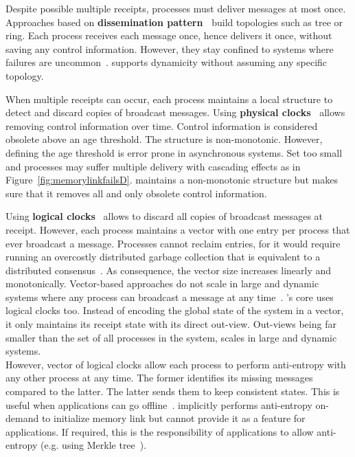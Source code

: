 Despite possible multiple receipts, processes must deliver messages at most
once. Approaches based on \textbf{dissemination
  pattern~\cite{bravo2017saturn,raynal2013distributed}} build topologies such as
tree or ring. Each process receives each message once, hence delivers it once,
without saving any control information. However, they stay confined to systems
where failures are uncommon~\cite{krasikova2016hashtable}. \RPCBROADCAST
supports dynamicity without assuming any specific topology. 

When multiple receipts can occur, each process maintains a local structure to
detect and discard copies of broadcast messages. Using \textbf{physical
  clocks~\cite{cachin2011introduction,demers1987epidemic}} allows removing
control information over time. Control information is considered obsolete above
an age threshold. The structure is non-monotonic. However, defining the age
threshold is error prone in asynchronous systems. Set too small and processes
may suffer multiple delivery with cascading effects as in
Figure~\ref{fig:memorylinkfailsD}.  \RPCBROADCAST maintains a non-monotonic
structure but makes sure that it removes all and only obsolete control
information.

Using \textbf{logical clocks}~\cite{malkhi2007concise,mukund2014optimized}
allows to discard all copies of broadcast messages at receipt. However, each
process maintains a vector with one entry per process that ever broadcast a
message.  Processes cannot reclaim entries, for it would require running an
overcostly distributed garbage collection that is equivalent to a distributed
consensus~\cite{abdullahi1998garbage}. As consequence, the vector size increases
linearly and monotonically. Vector-based approaches do not scale in large and
dynamic systems where any process can broadcast a message at any
time~\cite{nedelec2016crate}. \RPCBROADCAST's core uses logical clocks
too. Instead of encoding the global state of the system in a vector, it only
maintains its receipt state with its direct out-view. Out-views being far
smaller than the set of all processes in the system,
\RPCBROADCAST scales in large and dynamic systems. \\
However, vector of logical clocks allow each process to perform anti-entropy
with any other process at any time. The former identifies its missing messages
compared to the latter.  The latter sends them to keep consistent states. This
is useful when applications can go
offline~\cite{demers1987epidemic}. \RPCBROADCAST implicitly performs
anti-entropy on-demand to initialize memory link but cannot provide it as a
feature for applications. If required, this is the responsibility of
applications to allow anti-entropy (e.g. using Merkle
tree~\cite{merkle1988digital}).

